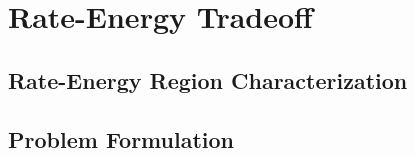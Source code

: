 \chapter{Rate-Energy Tradeoff}



\section{Rate-Energy Region Characterization}\label{sec:rate-energy-region-characterization}
  

\section{Problem Formulation}\label{sec:problem-formulation}
  
